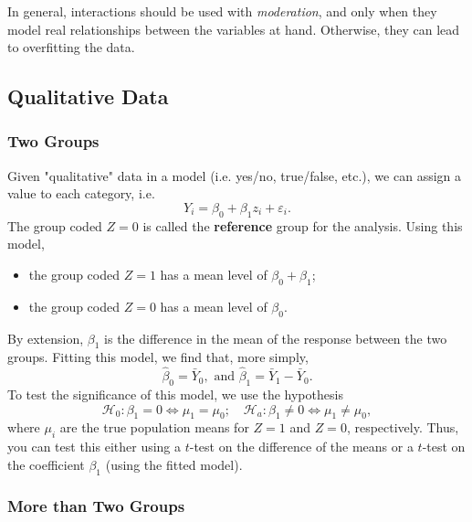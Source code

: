 \documentclass[12pt]{article}
\begin{document}
In general, interactions should be used with \textit{moderation}, and only when they model real relationships between the variables at hand. Otherwise, they can lead to overfitting the data.

\subsection{Qualitative Data}

\subsubsection{Two Groups}
Given "qualitative" data in a model (i.e. yes/no, true/false, etc.), we can assign a value to each category, i.e. \[Y_i = \beta_0 + \beta_1 z_i + \varepsilon_i.\] The group coded $Z = 0$ is called the \textbf{reference} group for the analysis. Using this model, \begin{itemize}
    \item the group coded $Z = 1$ has a mean level of $\beta_0 + \beta_1$;
    \item the group coded $Z = 0$ has a mean level of $\beta_0$.
\end{itemize}

By extension, $\beta_1$ is the difference in the mean of the response between the two groups. Fitting this model, we find that, more simply, \[\hat{\beta}_0 = \bar{Y}_0, \text{ and } \hat{\beta}_1 = \bar{Y}_1 - \bar{Y}_0.\] To test the significance of this model, we use the hypothesis \[\mathcal{H}_0: \beta_1 = 0 \iff \mu_1 = \mu_0; \quad \mathcal{H}_a: \beta_1 \neq 0 \iff \mu_1 \neq \mu_0,\] where $\mu_i$ are the true population means for $Z = 1$ and $Z = 0$, respectively. Thus, you can test this either using a $t$-test on the difference of the means or a $t$-test on the coefficient $\beta_1$ (using the fitted model).

\subsubsection{More than Two Groups}
\end{document}
